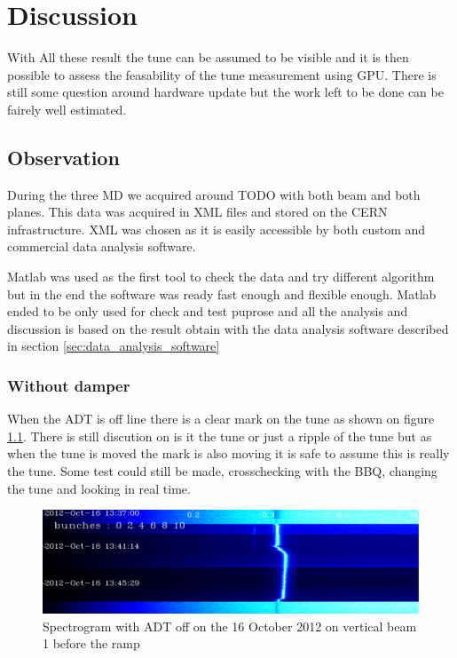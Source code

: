 
\chapter{Discussion}

With All these result the tune can be assumed to be visible and it is then possible to assess the feasability of the tune measurement using \gls{GPU}. There is still some question around hardware update but the work left to be done can be fairely well estimated.

\section{Observation}

During the three \gls{MD} we acquired around TODO with both beam and both planes. This data was acquired in XML files and stored on the \gls{CERN} infrastructure. XML was chosen as it is easily accessible by both custom and commercial data analysis software.

Matlab was used as the first tool to check the data and try different algorithm but in the end the software was ready fast enough and flexible enough. Matlab ended to be only used for check and test puprose and all the analysis and discussion is based on the result obtain with the data analysis software described in section \ref{sec:data_analysis_software}

	\subsection{Without damper}

	When the \gls{ADT} is off line there is a clear mark on the tune as shown on figure \ref{fig:adt_off}. There is still discution on is it the tune or just a ripple of the tune but as when the tune is moved the mark is also moving it is safe to assume this is really the tune. Some test could still be made, crosschecking with the \gls{BBQ}, changing the tune and looking in real time.

	\begin{figure}[H]
	\caption{Spectrogram with ADT off on the 16 October 2012 on vertical beam 1 before the ramp}
	\label{fig:adt_off}
	\centering
	\includegraphics[scale=0.3]{md-121016-vb1-m1-6bunches-10acc-1337-1349-ADT-off.pdf}
	\end{figure}

